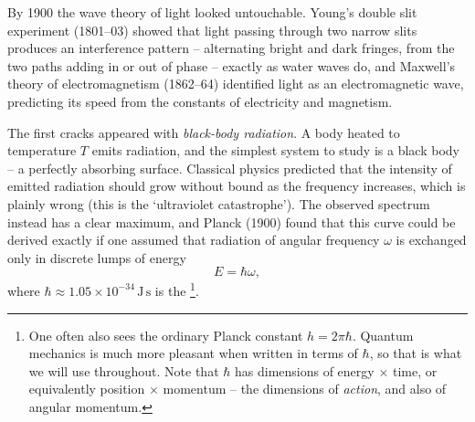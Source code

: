 \documentclass[a4paper]{scrartcl}
\begin{document}
By 1900 the wave theory of light looked untouchable. Young's double slit experiment (1801--03) showed that light passing through two narrow slits produces an interference pattern -- alternating bright and dark fringes, from the two paths adding in or out of phase -- exactly as water waves do, and Maxwell's theory of electromagnetism (1862--64) identified light as an electromagnetic wave, predicting its speed from the constants of electricity and magnetism.

\begin{center}
\end{center}

The first cracks appeared with \emph{black-body radiation}. A body heated to temperature $T$ emits radiation, and the simplest system to study is a black body -- a perfectly absorbing surface. Classical physics predicted that the intensity of emitted radiation should grow without bound as the frequency increases, which is plainly wrong (this is the `ultraviolet catastrophe'). The observed spectrum instead has a clear maximum, and Planck (1900) found that this curve could be derived exactly if one assumed that radiation of angular frequency $\omega$ is exchanged only in discrete lumps of energy
$$
E = \hbar \omega,
$$
where $\hbar \approx 1.05 \times 10^{-34} \, \mathrm{J \, s}$ is the \footnote{One often also sees the ordinary Planck constant $h = 2 \pi \hbar$. Quantum mechanics is much more pleasant when written in terms of $\hbar$, so that is what we will use throughout. Note that $\hbar$ has dimensions of energy $\times$ time, or equivalently position $\times$ momentum -- the dimensions of \emph{action}, and also of angular momentum.}.
\end{document}
